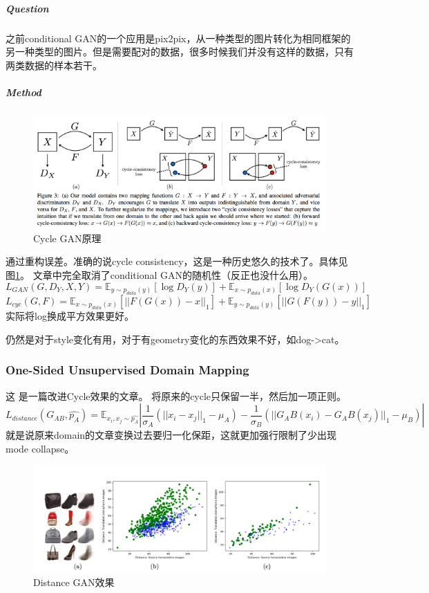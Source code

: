 \documentclass[a4paper]{article}
\begin{document}
\subparagraph{Question}
之前conditional GAN的一个应用是pix2pix，从一种类型的图片转化为相同框架的另一种类型的图片。但是需要配对的数据，很多时候我们并没有这样的数据，只有两类数据的样本若干。
\subparagraph{Method}
\begin{figure}
\centering
\includegraphics[width=\textwidth]{./img/18.png}
\caption{Cycle GAN原理}
\label{fig:18}
\end{figure}
通过重构误差。准确的说cycle consistency，这是一种历史悠久的技术了。具体见图\ref{fig:18}。
文章中完全取消了conditional GAN的随机性（反正也没什么用）。
$$L_{GAN}(G,D_Y,X,Y)=\mathbb{E}_{y\sim p_{data}(y)}[\log D_Y(y)]+\mathbb{E}_{x\sim p_{data}(x)}[\log D_Y(G(x))]$$
$$L_{cyc}(G,F)=\mathbb{E}_{x\sim p_{data}(x)}[||F(G(x))-x||_1]+\mathbb{E}_{y\sim p_{data}(y)}[||G(F(y))-y||_1]$$
实际将log换成平方效果更好。

仍然是对于style变化有用，对于有geometry变化的东西效果不好，如dog->cat。
\subsubsection{One-Sided Unsupervised Domain Mapping\cite{DBLP:journals/corr/BenaimW17}}
这
是一篇改进Cycle效果的文章。
将原来的cycle只保留一半，然后加一项正则。
$$L_{distance}(G_{AB},\hat{p_A})=\mathbb{E}_{x_i,x_j\sim \hat{p_A}}|\frac{1}{\sigma_A}(||x_i-x_j||_1-\mu_A)-\frac{1}{\sigma_B}(||G_AB(x_i)-G_AB(x_j)||_1-\mu_B)|$$
就是说原来domain的文章变换过去要归一化保距，这就更加强行限制了少出现mode collapse。
\begin{figure}
\centering
\includegraphics[width=\textwidth]{./img/19.png}
\caption{Distance GAN效果}
\label{fig:19}
\end{figure}
\end{document}

